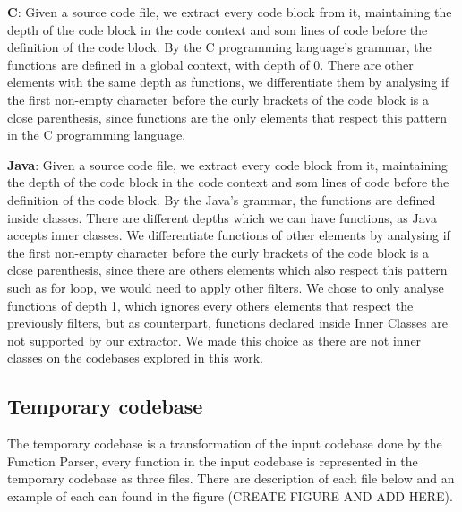 \begin{itemize}
	\begin{item}
		\textbf{C}: Given a source code file, we extract every code block from it, maintaining the depth of the code block in
		the code context and som lines of code before the definition of the code block. By the C programming language's grammar, 
		the functions are defined in a global context, with depth of 0. There are other elements with the same depth as functions,
		we differentiate them by analysing if the first non-empty character before the curly brackets of the code block is a close 
		parenthesis, since functions are the only elements that respect this pattern in the C programming language.
	\end{item}
	\begin{item}
		\textbf{Java}: Given a source code file, we extract every code block from it, maintaining the depth of the code block in
		the code context and som lines of code before the definition of the code block. By the Java's grammar, 
		the functions are defined inside classes. There are different depths which we can have functions, as Java accepts inner
		classes. We differentiate functions of other elements by analysing if the first non-empty character before the curly brackets of the code block is a close 
		parenthesis, since there are others elements which also respect this pattern such as for loop, we would need to apply other 
		filters. We chose to only analyse functions of depth 1, which ignores every others elements that respect the previously
		filters, but as counterpart, functions declared inside Inner Classes are not supported by our extractor. We made this choice
		as there are not inner classes on the codebases explored in this work.

	\end{item}
\end{itemize}

\subsection{Temporary codebase}

The temporary codebase is a transformation of the input codebase done by the Function Parser, every function in the input codebase
is represented in the temporary codebase as three files. There are description of each file below and an example of each can found
in the figure (CREATE FIGURE AND ADD HERE).

